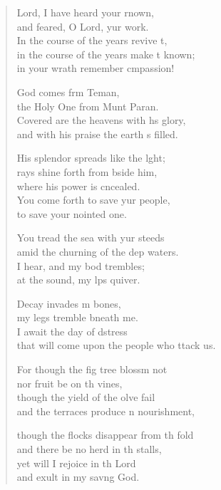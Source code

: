 \settowidth{\versewidth}{that will come upon the people who attack us.}
\begin{verse}%
  \begin{patverse}
 Lord, I have heard your rnown,\Med\\
and feared, O Lord, yur work.\\
In the course of the years revive \pointup{\i}t,\Flex\\
in the course of the years make \pointup{\i}t known;\Med\\
in your wrath remember cmpassion!

God comes frm Teman,\Med\\
the Holy One from Munt Paran.\\
Covered are the heavens with h\pointup{\i}s glory,\Med\\
and with his praise the earth \pointup{\i}s filled.

His splendor spreads like the l\pointup{\i}ght;\Flex\\
rays shine forth from bside him,\Med\\
where his power is cncealed.\\
You come forth to save yur people,\Med\\
to save your nointed one.

You tread the sea with yur steeds\Med\\
amid the churning of the dep waters.\\
I hear, and my bod trembles;\Med\\
at the sound, my l\pointup{\i}ps quiver.

Decay invades m bones,\Med\\
my legs tremble bneath me.\\
I await the day of d\pointup{\i}stress\Med\\
that will come upon the people who ttack us.

For though the fig tree blossm not\Med\\
nor fruit be on th vines,\\
though the yield of the ol\pointup{\i}ve fail\Med\\
and the terraces produce n nourishment,

though the flocks disappear from th fold\Med\\
and there be no herd in th stalls,\\
yet will I rejoice in th Lord\Med\\
and exult in my sav\pointup{\i}ng God.


\end{patverse}
\end{verse}
